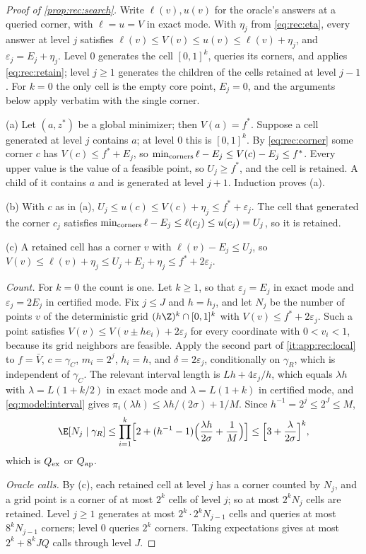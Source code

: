 \begin{proof}[Proof of \cref{prop:rec:search}]
Write $\ell(v),u(v)$ for the oracle's answers at a queried corner, with
$\ell=u=V$ in exact mode. With $\eta_j$ from \eqref{eq:rec:eta}, every answer
at level $j$ satisfies $\ell(v)\le V(v)\le u(v)\le\ell(v)+\eta_j$, and
$\varepsilon_j=E_j+\eta_j$. Level $0$ generates the cell
$[0,1]^k$, queries its corners, and applies \eqref{eq:rec:retain}; level
$j\ge1$ generates the children of the cells retained at level $j-1$. For
$k=0$ the only cell is the empty core point, $E_j=0$, and the arguments below
apply verbatim with the single corner.

(a) Let $(a,z^*)$ be a global minimizer; then $V(a)=f^*$. Suppose a cell
generated at level $j$ contains $a$; at level $0$ this is $[0,1]^k$. By
\eqref{eq:rec:corner} some corner $c$ has $V(c)\le f^*+E_j$, so
$\min_{\rm corners}\ell-E_j\le V(c)-E_j\le f^*$. Every upper value is the
value of a feasible point, so $U_j\ge f^*$, and the cell is retained. A
child of it contains $a$ and is generated at level $j+1$. Induction proves
(a).

(b) With $c$ as in (a), $U_j\le u(c)\le V(c)+\eta_j\le
f^*+\varepsilon_j$. The cell that generated the corner $c_j$ satisfies
$\min_{\rm corners}\ell-E_j\le\ell(c_j)\le u(c_j)=U_j$, so it is retained.

(c) A retained cell has a corner $v$ with $\ell(v)-E_j\le U_j$, so
$V(v)\le\ell(v)+\eta_j\le U_j+E_j+\eta_j\le f^*+2\varepsilon_j$.

\emph{Count.} For $k=0$ the count is one. Let $k\ge1$, so that
$\varepsilon_j=E_j$ in exact mode and $\varepsilon_j=2E_j$ in certified mode.
Fix $j\le J$ and $h=h_j$, and let $N_j$ be the number of
points $v$ of the deterministic grid $(h\Z)^k\cap[0,1]^k$ with
$V(v)\le f^*+2\varepsilon_j$. Such a point satisfies
$V(v)\le V(v\pm he_i)+2\varepsilon_j$ for every coordinate with $0<v_i<1$,
because its grid neighbors are feasible. Apply the second part of
\ref{it:app:rec:local} to $f=\bar V$, $c=\gamma_C$, $m_i=2^j$, $h_i=h$, and
$\delta=2\varepsilon_j$, conditionally on $\gamma_R$, which is independent of
$\gamma_C$. The relevant interval length is $Lh+4\varepsilon_j/h$, which equals
$\lambda h$ with $\lambda=L(1+k/2)$ in exact mode and $\lambda=L(1+k)$ in
certified mode, and \eqref{eq:model:interval} gives
$\pi_i(\lambda h)\le\lambda h/(2\sigma)+1/M$. Since $h^{-1}=2^j\le2^J\le M$,
\[
 \E[N_j\mid\gamma_R]\le\prod_{i=1}^k\Bigl[2+(h^{-1}-1)\Bigl(\frac{\lambda h}{2\sigma}
 +\frac1M\Bigr)\Bigr]\le\Bigl[3+\frac\lambda{2\sigma}\Bigr]^k,
\]
which is $Q_{\rm ex}$ or $Q_{\rm ap}$.

\emph{Oracle calls.} By (c), each retained cell at level $j$ has a corner
counted by $N_j$, and a grid point is a corner of at most $2^k$ cells of
level $j$; so at most $2^kN_j$ cells are retained. Level $j\ge1$ generates
at most $2^k\cdot2^kN_{j-1}$ cells and queries at most $8^kN_{j-1}$ corners;
level $0$ queries $2^k$ corners. Taking expectations gives at most
$2^k+8^kJQ$ calls through level $J$.
\end{proof}

